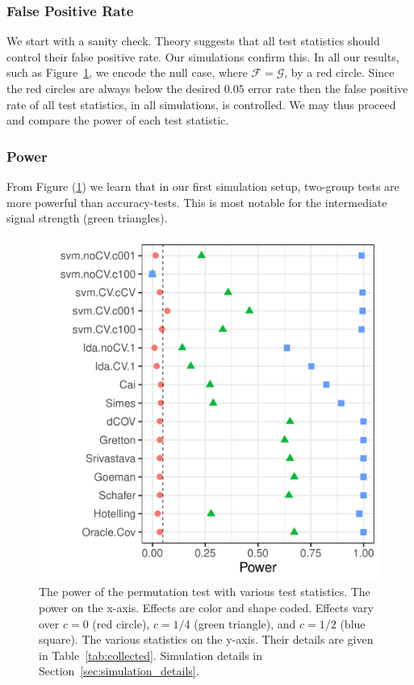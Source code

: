 \documentclass[]{bio}
\begin{document}
\subsubsection{False Positive Rate}
\label{sec:type_i}

We start with a sanity check. 
Theory suggests that all test statistics should control their false positive rate. 
Our simulations confirm this.
In all our results, such as Figure~\ref{fig:simulation_1}, we encode the null case, where $\mathcal{F}=\mathcal{G}$, by a red circle. 
Since the red circles are always below the desired $0.05$ error rate then the false positive rate of all test statistics, in all simulations, is controlled. 
We may thus proceed and compare the power of each test statistic. 






\subsubsection{Power}
\label{sec:power}

From Figure (\ref{fig:simulation_1}) we learn that in our first simulation setup, two-group tests are more powerful than accuracy-tests.
This is most notable for the intermediate signal strength (green triangles). 

\begin{figure}[h]
	\centering
	\includegraphics[width=0.5\columnwidth]{"art/file2"}
	\caption{
		The power of the permutation test with various test statistics. 
		The power on the x-axis. 
		Effects are color and shape coded. 
		Effects vary over $c=0$ (red circle), $c=1/4$ (green triangle), and $c=1/2$ (blue square). 
		The various statistics on the y-axis. 
		Their details are given in Table~\ref{tab:collected}. 
		Simulation details in Section~\ref{sec:simulation_details}.}	
	\label{fig:simulation_1}
\end{figure}
\end{document}
